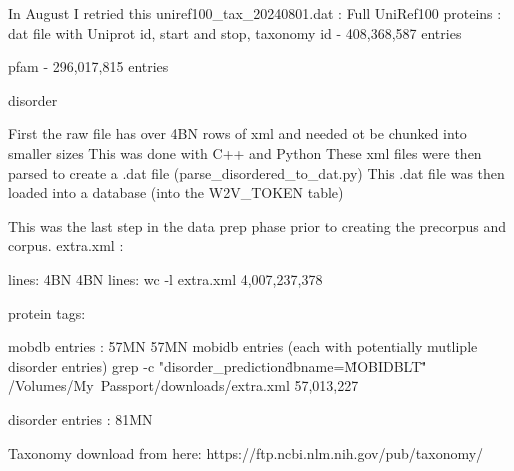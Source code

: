 \documentclass{article}
\begin{document}
In August I retried this
uniref100_tax_20240801.dat :    Full UniRef100 proteins : dat file with Uniprot id, start and stop, taxonomy id - 408,368,587 entries



pfam - 296,017,815 entries

disorder

First the raw file has over 4BN rows of xml and needed ot be chunked into smaller sizes
This was done with C++ and Python
These xml files were then parsed to create a .dat file (parse_disordered_to_dat.py)
This .dat file was then loaded into a database (into the W2V_TOKEN table)

This was the last step in the data prep phase prior to creating the precorpus and corpus.
extra.xml : 

lines: 4BN
4BN lines: wc -l extra.xml
4,007,237,378

protein tags: 

mobdb entries : 57MN
57MN mobidb entries (each with potentially mutliple disorder entries)
grep -c "disorder_prediction\" dbname=\"MOBIDBLT\"" /Volumes/My\ Passport/downloads/extra.xml
57,013,227

disorder entries : 81MN


Taxonomy
download from here: https://ftp.ncbi.nlm.nih.gov/pub/taxonomy/
\end{document}
